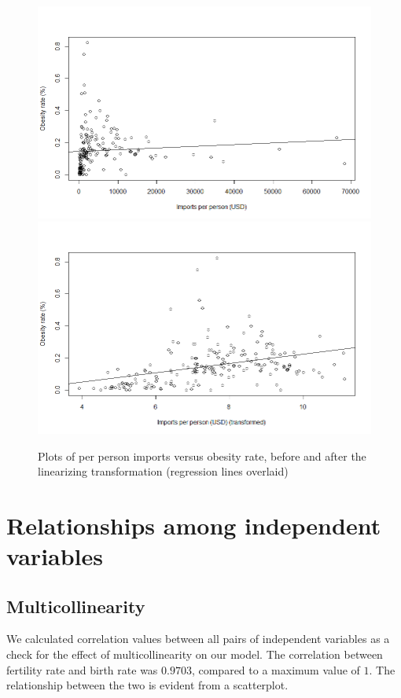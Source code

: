 \documentclass[oneside,12pt]{report}
\begin{document}
\begin{figure}
\centering
\caption{Plots of per person imports versus obesity rate, before and after the linearizing transformation (regression lines overlaid)}
\label{fig:ppimports-obesity-prepost}
\includegraphics[width=\textwidth]{ppimports-obesity-pretransform.png}
\includegraphics[width=\textwidth]{ppimports-obrate-posttransform.png}
\end{figure}


\section*{Relationships among independent variables}
\subsection*{Multicollinearity}

We calculated correlation values between all pairs of independent variables as a check for the effect of multicollinearity on our model. The correlation between fertility rate and birth rate was \begin{math}0.9703\end{math}, compared to a maximum value of \begin{math}1\end{math}. The relationship between the two is evident from a scatterplot. 
\end{document}
